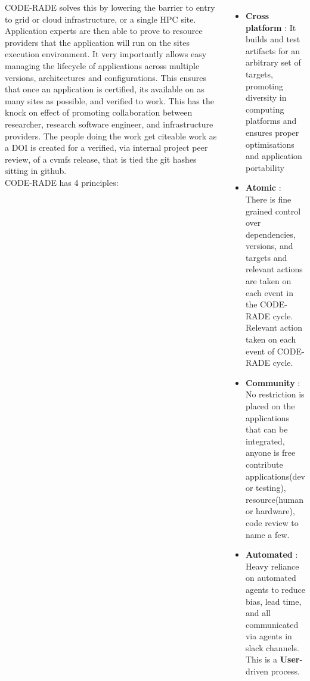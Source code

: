 \documentclass[17pt, a0paper, landscape, margin=0mm, innermargin=15mm,
     blockverticalspace=10mm, colspace=5mm, subcolspace=8mm]{tikzposter} %
\begin{document}
\begin{columns}
{             CODE-RADE solves this by lowering the barrier to entry to grid or cloud infrastructure, or a single HPC site. 
                  Application experts are then able to prove to resource providers that the application will run on the sites execution environment. 
                  It very importantly allows easy  managing the lifecycle of applications across multiple versions, architectures and configurations. 
                  This ensures that once an application is certified, its available on as many sites as possible, and verified to work.
                  This has the knock on effect of promoting collaboration between researcher, research software engineer, and infrastructure providers. 
                  The people doing the work get citeable work as a DOI is created for a verified, via internal project peer review, of a cvmfs release, that is tied the git hashes sitting in github. 
         \vspace{2cm}\\
         CODE-RADE has 4 principles:
         \begin{itemize}
                 \item \textbf{Cross platform} : It builds and test artifacts for an arbitrary set of targets, promoting diversity in computing platforms and ensures proper optimisations and application portability 
                \item \textbf{Atomic} :
                                 There is fine grained control over dependencies, versions, and targets and relevant actions are taken on each event in the CODE-RADE cycle. \\
                                 Relevant action taken on each event of CODE-RADE cycle. 
                  \item \textbf{Community} :
                      No restriction is placed on the applications that can be integrated, anyone is free contribute applications(dev or testing), resource(human or hardware), code review to name a few. 
                  \item \textbf{Automated} :
                      Heavy reliance on automated agents to reduce bias, lead time, and all communicated via agents in slack channels. This is a \textbf{User}-driven process. 
             \end{itemize}

         }



\end{columns}
\end{document}
